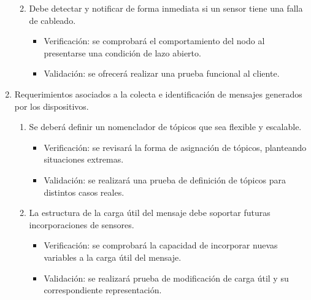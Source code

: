 \documentclass[
11pt, %
]{charter}
\begin{document}
\begin{enumerate}
\begin{enumerate}
\begin{itemize}
			\end{itemize}
			\item Debe detectar y notificar de forma inmediata si un sensor tiene una falla de cableado.
			\begin{itemize}
				\item Verificación: se comprobará el comportamiento del nodo al presentarse una condición de lazo abierto.
				\item Validación: se ofrecerá realizar una prueba funcional al cliente.
			\end{itemize}
		\end{enumerate}
		
	\item Requerimientos asociados a la colecta e identificación de mensajes generados por los dispositivos.
		\begin{enumerate}
			\item Se deberá definir un nomenclador de tópicos que sea flexible y escalable.
			\begin{itemize}
				\item Verificación: se revisará la forma de asignación de tópicos, planteando situaciones extremas.
				\item Validación: se realizará una prueba de definición de tópicos para distintos casos reales.
			\end{itemize}
			\item La estructura de la carga útil del mensaje debe soportar futuras  incorporaciones de sensores.
			\begin{itemize}
				\item Verificación: se comprobará la capacidad de incorporar nuevas variables a la carga útil del mensaje.
				\item Validación: se realizará prueba de modificación de carga útil y su correspondiente representación.
			\end{itemize}
		\end{enumerate}


\end{enumerate}
\end{document}
